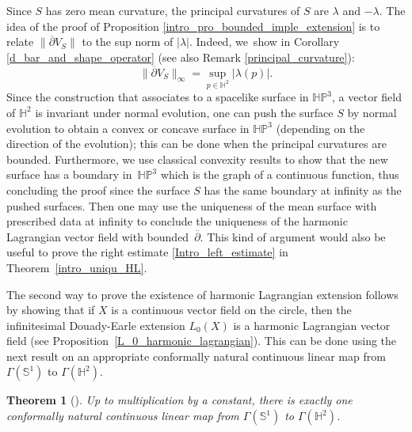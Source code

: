 \documentclass[10pt]{amsart}
\theoremstyle{plain}
\newtheorem{theorem}[cor]{Theorem}
\theoremstyle{definition}
\newcommand{\HP}{\mathbb{HP}^3}
\begin{document}
Since \(S \) has zero mean curvature, the principal curvatures of \(S \) are \(\lambda\) and \(-\lambda\). The idea of the proof of Proposition \ref{intro_pro_bounded_imple_extension} is to relate \(\lVert \overline{\partial} V_S \rVert\) to the sup norm of \(\lvert \lambda \rvert\). Indeed, we~show in Corollary \ref{d_bar_and_shape_operator} (see also Remark \ref{principal_curvature}):
\[
\lVert \overline{\partial} V_S \rVert_{\infty} = \sup_{p \in \mathbb{H}^2} \lvert \lambda(p) \rvert.
\]
Since the construction that associates to a spacelike surface in \(\HP\), a vector field of \(\mathbb{H}^2\) is invariant under normal evolution, one can push the surface \(S \) by normal evolution to obtain a convex or concave surface in \(\HP\) (depending on the direction of the evolution); this can be done when the principal curvatures are bounded. Furthermore, we use classical convexity results to show that the new surface has a boundary in~\(\HP\) which is the graph of a continuous function, thus concluding the proof since the surface \(S \) has the same boundary at infinity as the pushed surfaces. Then one may use the uniqueness of the mean surface with prescribed data at infinity to conclude the uniqueness of the harmonic Lagrangian vector field with bounded~\(\overline{\partial}\). This kind of argument would also be useful to prove the right estimate \eqref{Intro_left_estimate} in Theorem~\ref{intro_uniqu_HL}.

The second way to prove the existence of harmonic Lagrangian extension follows by showing that if \(X \) is a continuous vector field on the circle, then the infinitesimal Douady-Earle extension \(L_0(X) \) is a harmonic Lagrangian vector field (see Proposition~\ref{L_0_harmonic_lagrangian}). This can be done using the next result on an appropriate conformally natural continuous linear map from \(\Gamma(\mathbb{S}^1)\) to \(\Gamma(\mathbb{H}^2)\).

\begin{theorem}[\cite{Uniqueness_of_operator_L}]\label{intro_earle_unique}
Up to multiplication by a constant, there is exactly one conformally natural continuous linear map from \(\Gamma(\mathbb{S}^1)\) to \(\Gamma(\mathbb{H}^2)\).
\end{theorem}
\end{document}
